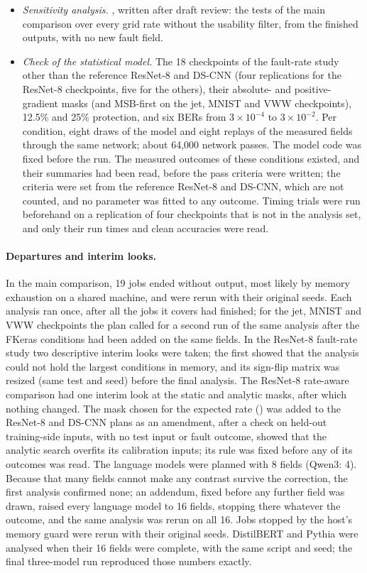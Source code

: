 \begin{itemize}
\item \emph{Sensitivity analysis.} , written after draft review: the tests of the main comparison over every grid rate without the usability filter, from the finished outputs, with no new fault field.
\item \emph{Check of the statistical model.} The 18 checkpoints of the fault-rate study other than the reference ResNet-8 and DS-CNN (four replications for the ResNet-8 checkpoints, five for the others), their absolute- and positive-gradient masks (and MSB-first on the jet, MNIST and VWW checkpoints), 12.5\% and 25\% protection, and six BERs from $3\times10^{-4}$ to $3\times10^{-2}$. Per condition, eight draws of the model and eight replays of the measured fields through the same network; about 64,000 network passes. The model code was fixed before the run. The measured outcomes of these conditions existed, and their summaries had been read, before the pass criteria were written; the criteria were set from the reference ResNet-8 and DS-CNN, which are not counted, and no parameter was fitted to any outcome. Timing trials were run beforehand on a replication of four checkpoints that is not in the analysis set, and only their run times and clean accuracies were read.
\end{itemize}

\paragraph{Departures and interim looks.} In the main comparison, 19 jobs ended without output, most likely by memory exhaustion on a shared machine, and were rerun with their original seeds. Each analysis ran once, after all the jobs it covers had finished; for the jet, MNIST and VWW checkpoints the plan called for a second run of the same analysis after the FKeras conditions had been added on the same fields. In the ResNet-8 fault-rate study two descriptive interim looks were taken; the first showed that the analysis could not hold the largest conditions in memory, and its sign-flip matrix was resized (same test and seed) before the final analysis. The ResNet-8 rate-aware comparison had one interim look at the static and analytic masks, after which nothing changed. The mask chosen for the expected rate () was added to the ResNet-8 and DS-CNN plans as an amendment, after a check on held-out training-side inputs, with no test input or fault outcome, showed that the analytic search overfits its calibration inputs; its rule was fixed before any of its outcomes was read. The language models were planned with 8 fields (Qwen3: 4). Because that many fields cannot make any contrast survive the correction, the first analysis confirmed none; an addendum, fixed before any further field was drawn, raised every language model to 16 fields, stopping there whatever the outcome, and the same analysis was rerun on all 16. Jobs stopped by the host's memory guard were rerun with their original seeds. DistilBERT and Pythia were analysed when their 16 fields were complete, with the same script and seed; the final three-model run reproduced those numbers exactly.

